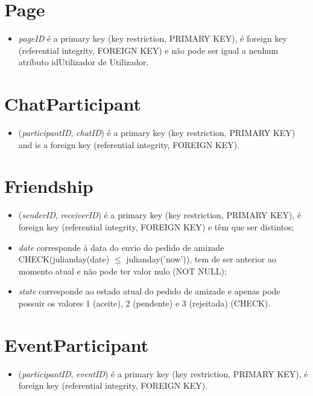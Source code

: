 \documentclass[12pt]{report}
\begin{document}
\section{Page}

\begin{itemize}
    \item \textit{pageID} é a primary key (key restriction, PRIMARY KEY), é foreign key (referential integrity, FOREIGN KEY) e não pode ser igual a nenhum atríbuto idUtilizador de Utilizador.
\end{itemize}

\section{ChatParticipant}

\begin{itemize}
    \item (\textit{participantID}, \textit{chatID}) é a primary key (key restriction, PRIMARY KEY) and is a foreign key (referential integrity, FOREIGN KEY).
\end{itemize}

\section{Friendship}

\begin{itemize}
    \item (\textit{senderID}, \textit{receiverID}) é a primary key (key restriction, PRIMARY KEY), é foreign key (referential integrity, FOREIGN KEY) e têm que ser distintos;
    \item \textit{date} corresponde à data do envio do pedido de amizade CHECK(julianday(date) $\leq$ julianday('now')), tem de ser anterior ao momento atual e não pode ter valor nulo (NOT NULL);
    \item \textit{state} corresponde ao estado atual do pedido de amizade e apenas pode possuir os valores 1 (aceite), 2 (pendente) e 3 (rejeitada) (CHECK).
\end{itemize}

\section{EventParticipant}

\begin{itemize}
    \item (\textit{participantID}, \textit{eventID}) é a primary key (key restriction, PRIMARY KEY), é foreign key (referential integrity, FOREIGN KEY).
\end{itemize}
\end{document}
